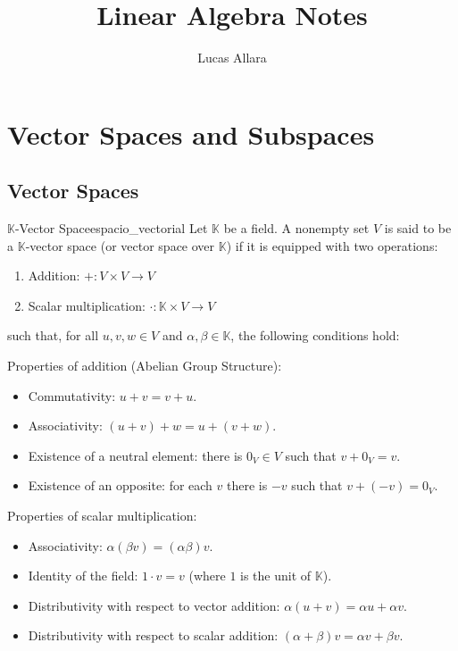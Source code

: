 \documentclass[11pt, a4paper]{article}
\title{\textbf{Linear Algebra Notes}}
\author{Lucas Allara}
\date{}
\begin{document}
\maketitle
\newpage

\tableofcontents
\newpage

\section{Vector Spaces and Subspaces}

\subsection{Vector Spaces}

\begin{definicion}{$\mathbb{K}$-Vector Space}{espacio_vectorial}
Let $\mathbb{K}$ be a field. A nonempty set $V$ is said to be a $\mathbb{K}$-vector space (or vector space over $\mathbb{K}$) if it is equipped with two operations:
\begin{enumerate}
    \item[i)] Addition: $+: V \times V \to V$
    \item[ii)] Scalar multiplication: $\cdot: \mathbb{K} \times V \to V$
\end{enumerate}
such that, for all $u, v, w \in V$ and $\alpha, \beta \in \mathbb{K}$, the following conditions hold:

Properties of addition (Abelian Group Structure):
\begin{itemize}
    \item Commutativity: $u+v = v+u$.
    \item Associativity: $(u+v)+w = u+(v+w)$.
    \item Existence of a neutral element: there is $0_V \in V$ such that $v + 0_V = v$.
    \item Existence of an opposite: for each $v$ there is $-v$ such that $v + (-v) = 0_V$.
\end{itemize}

Properties of scalar multiplication:
\begin{itemize}
    \item Associativity: $\alpha(\beta v) = (\alpha\beta)v$.
    \item Identity of the field: $1 \cdot v = v$ (where $1$ is the unit of $\mathbb{K}$).
    \item Distributivity with respect to vector addition: $\alpha(u+v) = \alpha u + \alpha v$.
    \item Distributivity with respect to scalar addition: $(\alpha+\beta)v = \alpha v + \beta v$.
\end{itemize}
\end{definicion}
\end{document}

